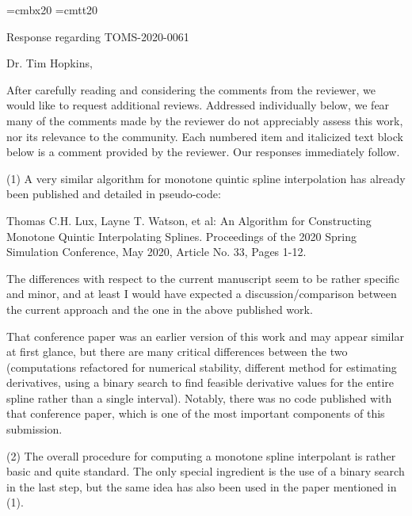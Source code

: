 
\parindent=0pt
\parskip=12pt

\font\titlebf=cmbx20
\font\titlett=cmtt20

{\titlebf Response regarding {\titlett TOMS-2020-0061} \bigskip}

Dr. Tim Hopkins,

After carefully reading and considering the comments from the reviewer, we would like to request additional reviews. Addressed individually below, we fear many of the comments made by the reviewer do not appreciably assess this work, nor its relevance to the community. Each numbered item and italicized text block below is a comment provided by the reviewer. Our responses immediately follow.

{\parindent=20pt \it

\item{(1)} A very similar algorithm for monotone quintic spline interpolation has already been published and detailed in pseudo-code:

\itemitem{} Thomas C.H. Lux, Layne T. Watson, et al: An Algorithm for Constructing Monotone Quintic Interpolating Splines. Proceedings of the 2020 Spring Simulation Conference, May 2020, Article No. 33, Pages 1-12.

\item{} The differences with respect to the current manuscript seem to be rather specific and minor, and at least I would have expected a discussion/comparison between the current approach and the one in the above published work.

}

That conference paper was an earlier version of this work and may appear similar at first glance, but there are many critical differences between the two (computations refactored for numerical stability, different method for estimating derivatives, using a binary search to find feasible derivative values for the entire spline rather than a single interval). Notably, there was no code published with that conference paper, which is one of the most important components of this submission.

{\parindent=20pt \it

\item{(2)} The overall procedure for computing a monotone spline interpolant is rather basic and quite standard. The only special ingredient is the use of a binary search in the last step, but the same idea has also been used in the paper mentioned in (1).

}

